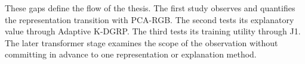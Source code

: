 These gaps define the flow of the thesis. The first study observes and
quantifies the representation transition with PCA-RGB. The second tests its
explanatory value through Adaptive K-DGRP. The third tests its training utility
through J1. The later transformer stage examines the scope of the observation
without committing in advance to one representation or explanation method.
